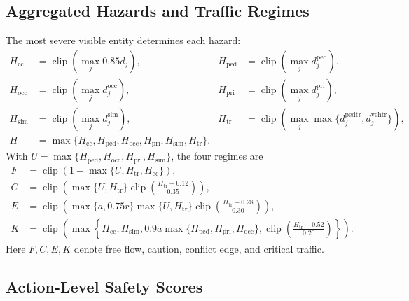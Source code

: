 \subsection{Aggregated Hazards and Traffic Regimes}

The most severe visible entity determines each hazard:
\[
\begin{aligned}
H_{\mathrm{cc}}&=\operatorname{clip}(\max_j 0.85d_j), &
H_{\mathrm{ped}}&=\operatorname{clip}(\max_j d^{\mathrm{ped}}_j),\\
H_{\mathrm{occ}}&=\operatorname{clip}(\max_j d^{\mathrm{occ}}_j), &
H_{\mathrm{pri}}&=\operatorname{clip}(\max_j d^{\mathrm{pri}}_j),\\
H_{\mathrm{sim}}&=\operatorname{clip}(\max_j d^{\mathrm{sim}}_j), &
H_{\mathrm{tr}}&=\operatorname{clip}(\max_j\max\{d^{\mathrm{pedtr}}_j,d^{\mathrm{vehtr}}_j\}),\\
H&=\max\{H_{\mathrm{cc}},H_{\mathrm{ped}},H_{\mathrm{occ}},H_{\mathrm{pri}},H_{\mathrm{sim}},H_{\mathrm{tr}}\}.
\end{aligned}
\]
With \(U=\max\{H_{\mathrm{ped}},H_{\mathrm{occ}},H_{\mathrm{pri}},H_{\mathrm{sim}}\}\), the four regimes are
\[
\begin{aligned}
F &= \operatorname{clip}(1-\max\{U,H_{\mathrm{tr}},H_{\mathrm{cc}}\}),\\
C &= \operatorname{clip}\!\left(\max\{U,H_{\mathrm{tr}}\}\operatorname{clip}\!\left(\frac{H_{\mathrm{tr}}-0.12}{0.35}\right)\right),\\
E &= \operatorname{clip}\!\left(\max\{a,0.75r\}\max\{U,H_{\mathrm{tr}}\}\operatorname{clip}\!\left(\frac{H_{\mathrm{tr}}-0.28}{0.30}\right)\right),\\
K &= \operatorname{clip}\!\left(\max\left\{H_{\mathrm{cc}},H_{\mathrm{sim}},0.9a\max\{H_{\mathrm{ped}},H_{\mathrm{pri}},H_{\mathrm{occ}}\},\operatorname{clip}\!\left(\frac{H_{\mathrm{tr}}-0.52}{0.20}\right)\right\}\right).
\end{aligned}
\]
Here \(F,C,E,K\) denote free flow, caution, conflict edge, and critical traffic.

\subsection{Action-Level Safety Scores}

